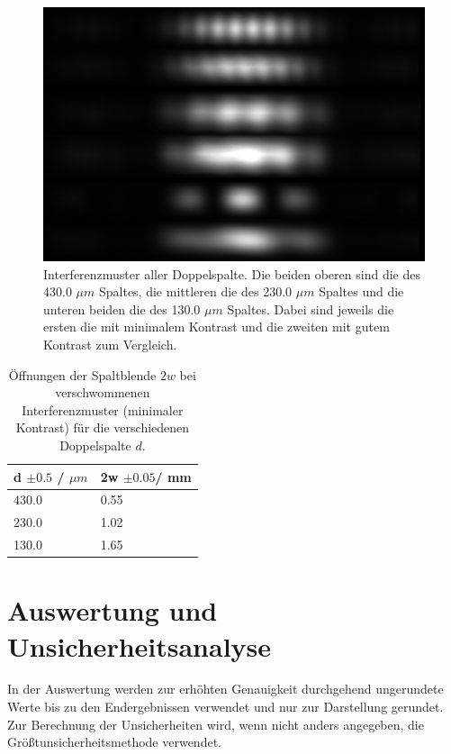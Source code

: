 \documentclass[12pt,a4paper,twoside]{article}
\begin{document}
\begin{figure}[H]
    \centering
    \includegraphics[width=0.7\linewidth]{nudes/aufgabe 4.jpg}
    \caption{Interferenzmuster aller Doppelspalte. Die beiden oberen sind die des 430.0 $\mu m$ Spaltes, die mittleren die des 230.0 $\mu m$ Spaltes und die unteren beiden die des 130.0 $\mu m$ Spaltes. 
    Dabei sind jeweils die ersten die mit minimalem Kontrast und die zweiten mit gutem Kontrast zum Vergleich. }
    \label{fig:aufgabe 4}
\end{figure}

\begin{table}[H]
    \centering
    \caption{Öffnungen der  Spaltblende $2w$ bei verschwommenen Interferenzmuster (minimaler Kontrast) für die verschiedenen Doppelspalte $d$. }
    \label{tab:öffnungen}
    \begin{tabular}{| l | l |}
        \hline
        d $\pm 0.5$ / $\mu m $ & 2w $\pm 0.05$/ mm \\
        \hline
        430.0 & 0.55  \\
        230.0 & 1.02  \\
        130.0 & 1.65  \\
        \hline
    \end{tabular}
\end{table}

\section{Auswertung und Unsicherheitsanalyse} %

In der Auswertung werden zur erhöhten Genauigkeit durchgehend ungerundete Werte bis zu den Endergebnissen verwendet und nur zur Darstellung gerundet. \\
Zur Berechnung der Unsicherheiten wird, wenn nicht anders angegeben, die Größtunsicherheitsmethode verwendet.
\end{document}
